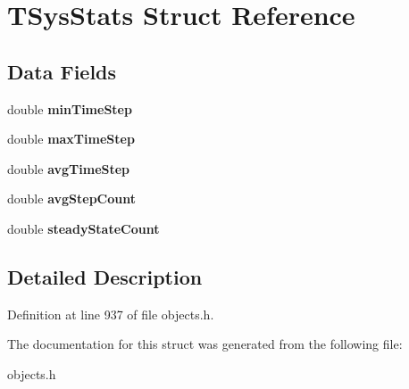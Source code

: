 \hypertarget{struct_t_sys_stats}{}\section{T\+Sys\+Stats Struct Reference}
\label{struct_t_sys_stats}
\subsection*{Data Fields}
\begin{DoxyCompactItemize}
\item 
\mbox{\label{struct_t_sys_stats_a4834afd1bd6792a0af3aeb420a2db3b6}} 
double {\bfseries min\+Time\+Step}
\item 
\mbox{\label{struct_t_sys_stats_a21d3794d45aa3a8c6c78e8a3c73b97b6}} 
double {\bfseries max\+Time\+Step}
\item 
\mbox{\label{struct_t_sys_stats_a7bb43795b7ab08b465cec8492244ce8f}} 
double {\bfseries avg\+Time\+Step}
\item 
\mbox{\label{struct_t_sys_stats_ac7a9dea0913b2f73e3ea319879b36121}} 
double {\bfseries avg\+Step\+Count}
\item 
\mbox{\label{struct_t_sys_stats_a46bac1ff1897067dfb5d1e44dbcc2a35}} 
double {\bfseries steady\+State\+Count}
\end{DoxyCompactItemize}


\subsection{Detailed Description}


Definition at line 937 of file objects.\+h.



The documentation for this struct was generated from the following file\+:\begin{DoxyCompactItemize}
\item 
objects.\+h\end{DoxyCompactItemize}

